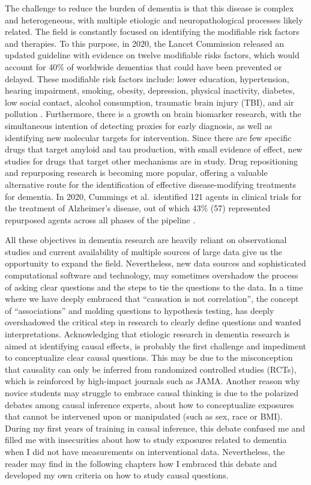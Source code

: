 \documentclass[
]{book}
\begin{document}
The challenge to reduce the burden of dementia is that this disease is complex and heterogeneous, with multiple etiologic and neuropathological processes likely related. The field is constantly focused on identifying the modifiable risk factors and therapies. To this purpose, in 2020, the Lancet Commission released an updated guideline with evidence on twelve modifiable risks factors, which would account for 40\% of worldwide dementias that could have been prevented or delayed. These modifiable risk factors include: lower education, hypertension, hearing impairment, smoking, obesity, depression, physical inactivity, diabetes, low social contact, alcohol consumption, traumatic brain injury (TBI), and air pollution \autocite{dementia_lancet}. Furthermore, there is a growth on brain biomarker research, with the simultaneous intention of detecting proxies for early diagnosis, as well as identifying new molecular targets for intervention. Since there are few specific drugs that target amyloid and tau production, with small evidence of effect, new studies for drugs that target other mechanisms are in study. Drug repositioning and repurposing research is becoming more popular, offering a valuable alternative route for the identification of effective disease-modifying treatments for dementia\autocite{ballard2020,langedijk2015}. In 2020, Cummings et al.~identified 121 agents in clinical trials for the treatment of Alzheimer's disease, out of which 43\% (57) represented repurposed agents across all phases of the pipeline \autocite{cummings2020}.

All these objectives in dementia research are heavily reliant on observational studies and current availability of multiple sources of large data give us the opportunity to expand the field. Nevertheless, new data sources and sophisticated computational software and technology, may sometimes overshadow the process of asking clear questions and the steps to tie the questions to the data. In a time where we have deeply embraced that ``causation is not correlation'', the concept of ``associations'' and molding questions to hypothesis testing, has deeply overshadowed the critical step in research to clearly define questions and wanted interpretations. Acknowledging that etiologic research in dementia research is aimed at identifying causal effects, is probably the first challenge and impediment to conceptualize clear causal questions. This may be due to the misconception that causality can only be inferred from randomized controlled studies (RCTs), which is reinforced by high-impact journals such as JAMA\autocite{jama}. Another reason why novice students may struggle to embrace causal thinking is due to the polarized debates among causal inference experts, about how to conceptualize exposures that cannot be intervened upon or manipulated (such as sex, race or BMI)\autocite{waterkills,schwartz2016}. During my first years of training in causal inference, this debate confused me and filled me with insecurities about how to study exposures related to dementia when I did not have measurements on interventional data. Nevertheless, the reader may find in the following chapters how I embraced this debate and developed my own criteria on how to study causal questions.
\end{document}
